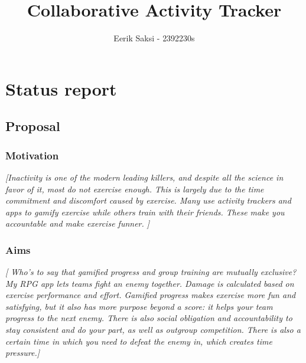 \documentclass[11pt]{article}
\title{Collaborative Activity Tracker}
\author{ {{Eerik Saksi}} - {{2392230s}} }
\begin{document}
    \maketitle
    
    
     

\section{Status report}

\subsection{Proposal}\label{proposal}

\subsubsection{Motivation}\label{motivation}

\emph{{[}Inactivity is one of the modern leading killers, and despite all the science in favor of it, most do not exercise enough. This is largely due to the time commitment and discomfort caused by exercise. Many use activity trackers and apps to gamify exercise while others train with their friends. These make you accountable and make exercise funner. {]}}

\subsubsection{Aims}\label{aims}

\emph{{[} Who's to say that gamified progress and group training are mutually exclusive? My RPG app lets teams fight an enemy together. Damage is calculated based on exercise performance and effort. Gamified progress makes exercise more fun and satisfying, but it also has more purpose beyond a score: it helps your team progress to the next enemy. There is also social obligation and accountability to stay consistent and do your part, as well as outgroup competition. There is also a certain time in which you need to defeat the enemy in, which creates time pressure.{]}}
\end{document}
